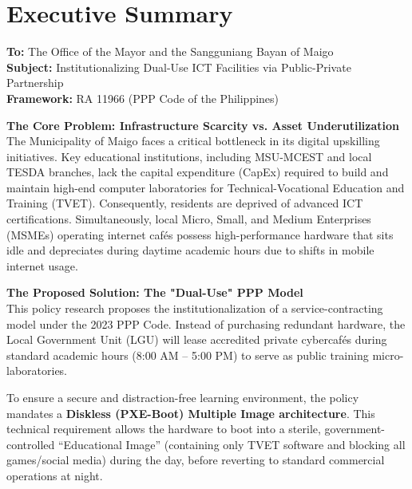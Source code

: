 \section*{Executive Summary}

\textbf{To:} The Office of the Mayor and the Sangguniang Bayan of Maigo \\
\textbf{Subject:} Institutionalizing Dual-Use ICT Facilities via Public-Private Partnership \\
\textbf{Framework:} RA 11966 (PPP Code of the Philippines)

\vspace{1em}
\noindent \textbf{The Core Problem: Infrastructure Scarcity vs. Asset Underutilization} \\
The Municipality of Maigo faces a critical bottleneck in its digital upskilling initiatives. Key educational institutions, including MSU-MCEST and local TESDA branches, lack the capital expenditure (CapEx) required to build and maintain high-end computer laboratories for Technical-Vocational Education and Training (TVET). Consequently, residents are deprived of advanced ICT certifications. Simultaneously, local Micro, Small, and Medium Enterprises (MSMEs) operating internet cafés possess high-performance hardware that sits idle and depreciates during daytime academic hours due to shifts in mobile internet usage.

\vspace{1em}
\noindent \textbf{The Proposed Solution: The "Dual-Use" PPP Model} \\
This policy research proposes the institutionalization of a service-contracting model under the 2023 PPP Code. Instead of purchasing redundant hardware, the Local Government Unit (LGU) will lease accredited private cybercafés during standard academic hours (8:00 AM -- 5:00 PM) to serve as public training micro-laboratories. 

To ensure a secure and distraction-free learning environment, the policy mandates a \textbf{Diskless (PXE-Boot) Multiple Image architecture}. This technical requirement allows the hardware to boot into a sterile, government-controlled ``Educational Image'' (containing only TVET software and blocking all games/social media) during the day, before reverting to standard commercial operations at night.

